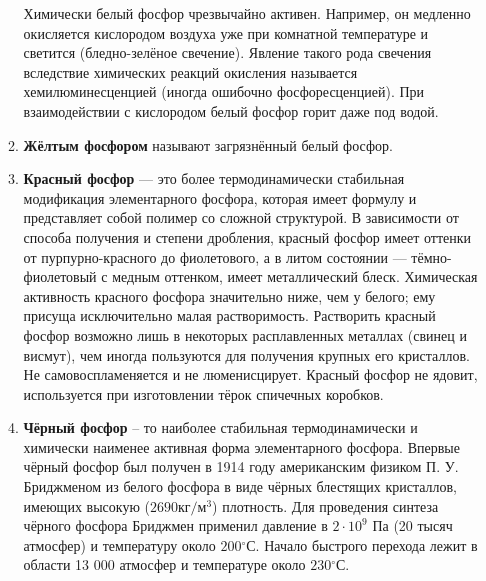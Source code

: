 \begin{itemize}
\begin{enumerate}
        Химически белый фосфор чрезвычайно активен. Например, он медленно окисляется кислородом воздуха уже при комнатной температуре и светится (бледно-зелёное свечение). Явление такого рода свечения вследствие химических реакций окисления называется хемилюминесценцией (иногда ошибочно фосфоресценцией). При взаимодействии с кислородом белый фосфор горит даже под водой. 
        
        \item \textbf{Жёлтым фосфором} называют загрязнённый белый фосфор.
        \item \textbf{Красный фосфор} — это более термодинамически стабильная модификация элементарного фосфора, которая имеет формулу  и представляет собой полимер со сложной структурой. В зависимости от способа получения и степени дробления, красный фосфор имеет оттенки от пурпурно-красного до фиолетового, а в литом состоянии — тёмно-фиолетовый с медным оттенком, имеет металлический блеск. Химическая активность красного фосфора значительно ниже, чем у белого; ему присуща исключительно малая растворимость. Растворить красный фосфор возможно лишь в некоторых расплавленных металлах (свинец и висмут), чем иногда пользуются для получения крупных его кристаллов. Не самовоспламеняется и не люменисцирует. Красный фосфор не ядовит, используется при изготовлении тёрок спичечных коробков.
        \item \textbf{Чёрный фосфор} -- то наиболее стабильная термодинамически и химически наименее активная форма элементарного фосфора. Впервые чёрный фосфор был получен в 1914 году американским физиком П. У. Бриджменом из белого фосфора в виде чёрных блестящих кристаллов, имеющих высокую ($2690 \text{кг}/\text{м}^{3}$) плотность. Для проведения синтеза чёрного фосфора Бриджмен применил давление в $2\cdot10^{9}$ Па (20 тысяч атмосфер) и температуру около $200 {}^{\circ}\mathrm{С}$. Начало быстрого перехода лежит в области 13 000 атмосфер и температуре около $230 {}^{\circ}\mathrm{С}$.


\end{enumerate}
\end{itemize}
